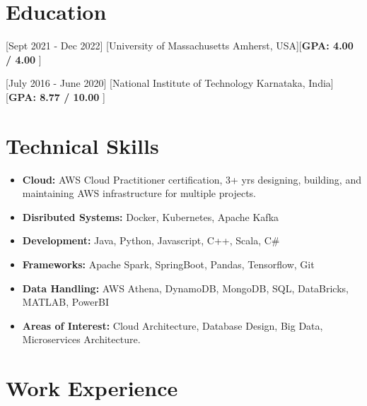 \documentclass{article}
\begin{document}

\makecvtitle %


\section{Education}

[Sept 2021 - Dec 2022]
[University of Massachusetts Amherst, USA][\textbf{GPA: 4.00 / 4.00 }]

[July 2016 - June 2020]
[National Institute of Technology Karnataka, India] [\textbf{GPA: 8.77 / 10.00 }]


\section{Technical Skills}

\begin{itemize}
\item \textbf{Cloud:} AWS Cloud Practitioner certification, 3+ yrs designing, building, and maintaining AWS infrastructure for multiple projects.
\item \textbf{Disributed Systems:} Docker, Kubernetes, Apache Kafka
\item \textbf{Development:} Java, Python, Javascript, C++, Scala, C\#
\item \textbf{Frameworks:} Apache Spark, SpringBoot, Pandas, Tensorflow, Git
\item \textbf{Data Handling:} AWS Athena, DynamoDB, MongoDB, SQL, DataBricks, MATLAB, PowerBI
\item \textbf{Areas of Interest:} Cloud Architecture, Database Design, Big Data, Microservices Architecture.

\end{itemize}


\section{Work Experience}
\end{document}

